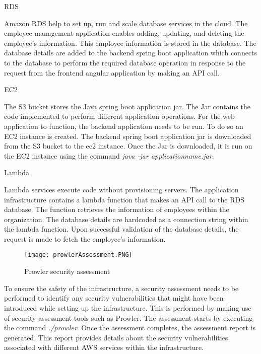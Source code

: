 \par RDS

\par Amazon RDS help to set up, run and scale database services in the cloud.
The employee management application enables adding, updating, and deleting the employee’s information.
This employee information is stored in the database.
The database details are added to the backend spring boot application which connects to the database to perform the required database operation in response to the request from the frontend angular application by making an API call.


\par EC2

\par The S3 bucket stores the Java spring boot application jar.
The Jar contains the code implemented to perform different application operations.
For the web application to function, the backend application needs to be run.
To do so an EC2 instance is created.
The backend spring boot application jar is downloaded from the S3 bucket to the ec2 instance.
Once the Jar is downloaded, it is run on the EC2 instance using the command \textit{java -jar applicationname.jar}.


\par Lambda

\par Lambda services execute code without provisioning servers.
The application infrastructure contains a lambda function that makes an API call to the RDS database.
The function retrieves the information of employees within the organization.
The database details are hardcoded as a connection string within the lambda function.
Upon successful validation of the database details, the request is made to fetch the employee’s information.
\begin{figure}
    \centering
    \texttt{[image: prowlerAssessment.PNG]}
    \caption{Prowler security assessment}
    \label{fig:prowlerassessmentreport}
\end{figure}
\par To ensure the safety of the infrastructure, a security assessment needs to be performed to identify any security vulnerabilities that might have been introduced while setting up the infrastructure. This is performed by making use of security assessment tools such as Prowler. The assessment starts by executing the command \textit{./prowler}. Once the assessment completes, the assessment report is generated. This report provides details about the security vulnerabilities associated with different AWS services within the infrastructure.

